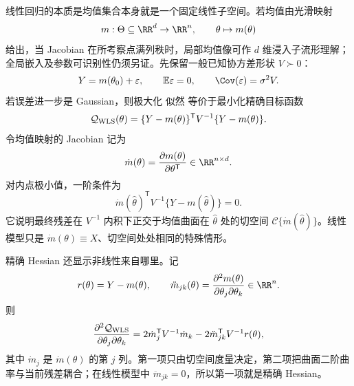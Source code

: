 \begin{definition}[非线性均值模型与加权目标]
线性回归的本质是均值集合本身就是一个固定线性子空间。若均值由光滑映射
\[
 m:\Theta\subseteq\RR^d\to\RR^n,
 \qquad
 \theta\mapsto m(\theta)
\]
给出，当 Jacobian 在所考察点满列秩时，局部均值像可作 $d$ 维浸入子流形理解；全局嵌入及参数可识别性仍须另证。先保留一般已知协方差形状 $V\succ0$：
\begin{equation*}Y=m(\theta_0)+\varepsilon,
 \qquad
 \mathbb E\varepsilon=0,
 \qquad
 \Cov(\varepsilon)=\sigma^2V.
\end{equation*}
若误差进一步是 Gaussian，则极大化 似然 等价于最小化精确目标函数
\begin{equation}\label{eq:math-stat-nonlinear-wls-objective}
 \mathcal Q_{\rm WLS}(\theta)
 =\{Y-m(\theta)\}^{\mathsf T}
 V^{-1}\{Y-m(\theta)\}.
\end{equation}
令均值映射的 Jacobian 记为
\[
 \dot m(\theta)
 =\frac{\partial m(\theta)}{\partial\theta^{\mathsf T}}
 \in\RR^{n\times d}.
\]
对内点极小值，一阶条件为
\begin{equation*}\dot m(\widehat\theta)^{\mathsf T}V^{-1}
 \{Y-m(\widehat\theta)\}=0.
\end{equation*}
它说明最终残差在 $V^{-1}$ 内积下正交于均值曲面在 $\widehat\theta$ 处的切空间 $\mathcal C\{\dot m(\widehat\theta)\}$。线性模型只是 $\dot m(\theta)\equiv X$、切空间处处相同的特殊情形。
\end{definition}

\begin{proposition}
精确 Hessian 还显示非线性来自哪里。记
\[
 r(\theta)=Y-m(\theta),
 \qquad
 \ddot m_{jk}(\theta)
 =\frac{\partial^2m(\theta)}
 {\partial\theta_j\partial\theta_k}
 \in\RR^n.
\]
则
\begin{equation}\label{eq:math-stat-nonlinear-exact-hessian}
 \frac{\partial^2\mathcal Q_{\rm WLS}}{\partial\theta_j\partial\theta_k}
 =2\dot m_j^{\mathsf T}V^{-1}\dot m_k
 -2\ddot m_{jk}^{\mathsf T}V^{-1}r(\theta),
\end{equation}
其中 $\dot m_j$ 是 $\dot m(\theta)$ 的第 $j$ 列。第一项只由切空间度量决定，第二项把曲面二阶曲率与当前残差耦合；在线性模型中 $\ddot m_{jk}=0$，所以第一项就是精确 Hessian。
\end{proposition}

